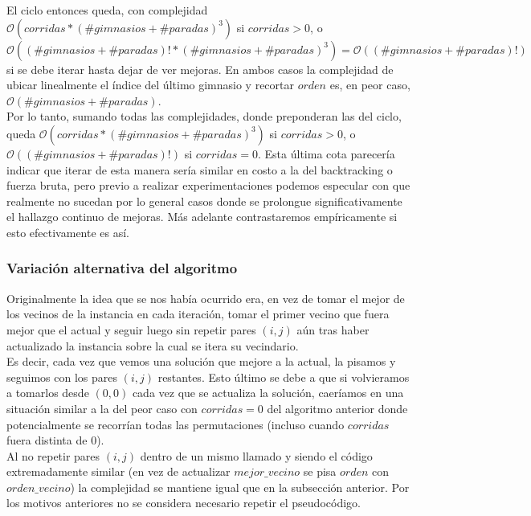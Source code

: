     El ciclo entonces queda, con complejidad $\mathcal{O}(corridas*(\#gimnasios + \#paradas)^3)$ si $corridas > 0$, o $\mathcal{O}((\#gimnasios + \#paradas)!*(\#gimnasios + \#paradas)^3) = \mathcal{O}((\#gimnasios + \#paradas)!)$ si se debe iterar hasta dejar de ver mejoras. En ambos casos la complejidad de ubicar linealmente el índice del último gimnasio y recortar $orden$ es, en peor caso, $\mathcal{O}(\#gimnasios + \#paradas)$.
    \\

    Por lo tanto, sumando todas las complejidades, donde preponderan las del ciclo, queda $\mathcal{O}(corridas*(\#gimnasios + \#paradas)^3)$ si $corridas > 0$, o $\mathcal{O}((\#gimnasios + \#paradas)!)$ si $corridas = 0$. Esta última cota parecería indicar que iterar de esta manera sería similar en costo a la del backtracking o fuerza bruta, pero previo a realizar experimentaciones podemos especular con que realmente no sucedan por lo general casos donde se prolongue significativamente el hallazgo continuo de mejoras. Más adelante contrastaremos empíricamente si esto efectivamente es así.

    \subsubsection{Variación alternativa del algoritmo}
    Originalmente la idea que se nos había ocurrido era, en vez de tomar el mejor de los vecinos de la instancia en cada iteración, tomar el primer vecino que fuera mejor que el actual y seguir luego sin repetir pares $(i,j)$ aún tras haber actualizado la instancia sobre la cual se itera su vecindario.
    \\

    Es decir, cada vez que vemos una solución que mejore a la actual, la pisamos y seguimos con los pares $(i,j)$ restantes. Esto último se debe a que si volvieramos a tomarlos desde $(0,0)$ cada vez que se actualiza la solución, caeríamos en una situación similar a la del peor caso con $corridas = 0$ del algoritmo anterior donde potencialmente se recorrían todas las permutaciones (incluso cuando $corridas$ fuera distinta de 0).
    \\

    Al no repetir pares $(i,j)$ dentro de un mismo llamado y siendo el código extremadamente similar (en vez de actualizar $mejor\_vecino$ se pisa $orden$ con $orden\_vecino$) la complejidad se mantiene igual que en la subsección anterior. Por los motivos anteriores no se considera necesario repetir el pseudocódigo.
    \\

